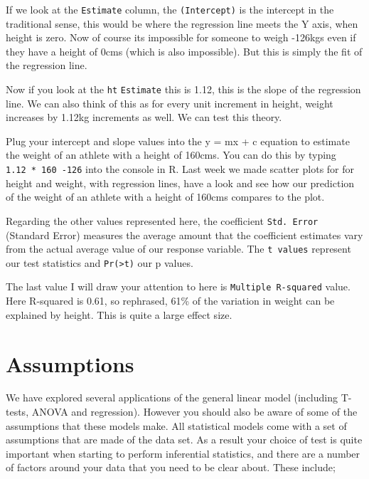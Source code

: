 \documentclass[
]{book}
\begin{document}
If we look at the \texttt{Estimate} column, the \texttt{(Intercept)} is the intercept in the traditional sense, this would be where the regression line meets the Y axis, when height is zero. Now of course its impossible for someone to weigh -126kgs even if they have a height of 0cms (which is also impossible). But this is simply the fit of the regression line.

Now if you look at the \texttt{ht} \texttt{Estimate} this is 1.12, this is the slope of the regression line. We can also think of this as for every unit increment in height, weight increases by 1.12kg increments as well. We can test this theory.

Plug your intercept and slope values into the y = mx + c equation to estimate the weight of an athlete with a height of 160cms. You can do this by typing \texttt{1.12\ *\ 160\ -126} into the console in R. Last week we made scatter plots for for height and weight, with regression lines, have a look and see how our prediction of the weight of an athlete with a height of 160cms compares to the plot.

Regarding the other values represented here, the coefficient \texttt{Std.\ Error} (Standard Error) measures the average amount that the coefficient estimates vary from the actual average value of our response variable. The \texttt{t\ values} represent our test statistics and \texttt{Pr(\textgreater{}\textbar{}t\textbar{})} our p values.

The last value I will draw your attention to here is \texttt{Multiple\ R-squared} value. Here R-squared is 0.61, so rephrased, 61\% of the variation in weight can be explained by height. This is quite a large effect size.

\hypertarget{assumptions}{%
\section{Assumptions}\label{assumptions}}

We have explored several applications of the general linear model (including T-tests, ANOVA and regression). However you should also be aware of some of the assumptions that these models make. All statistical models come with a set of assumptions that are made of the data set. As a result your choice of test is quite important when starting to perform inferential statistics, and there are a number of factors around your data that you need to be clear about. These include;
\end{document}
